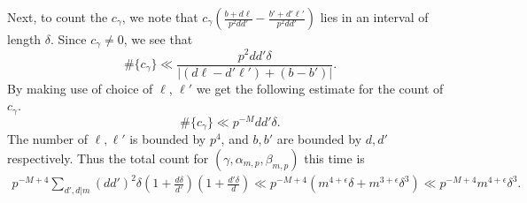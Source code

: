 \documentclass[11pt]{amsart}
\numberwithin{equation}{section}
\theoremstyle{plain}
\theoremstyle{definition}
\newcommand{\sumn}{\sum \nolimits}
\begin{document}
Next, to count the $c_\gamma$, we note that $c_\gamma(\frac{ b+d\ell }{p^2dd'}-\frac{b'+d'\ell'}{p^2dd'})$ lies in an interval of length $\delta$. Since $c_\gamma\neq 0$, we see that
\begin{equation}
    \# \{c_\gamma\}\ll \frac{p^2dd'\delta}{|(d\ell-d'\ell')+(b-b')|}.
\end{equation}
By making use of choice of $\ell$, $\ell'$ we get the following estimate for the count of $c_\gamma$.
\begin{equation}
    \# \{c_\gamma\}\ll p^{-M}dd'\delta.
\end{equation}
The number of $\ell, \ell'$ is bounded by $p^4$, and $b,b'$ are bounded by $d,d'$ respectively.
Thus the total count for $(\gamma, \alpha_{m,p}, \beta_{m,p})$ this time is
\begin{align}
     p^{-M+4}\sumn_{d',d|m} (dd')^2\delta(1+\frac{d\delta}{d'})(1+\frac{d'\delta}{d}) \ll p^{-M+4}(m^{4+\epsilon}\delta+ m^{3+\epsilon} \delta^3)\ll p^{-M+4}m^{4+\epsilon}\delta^3.
\end{align}
\end{document}
